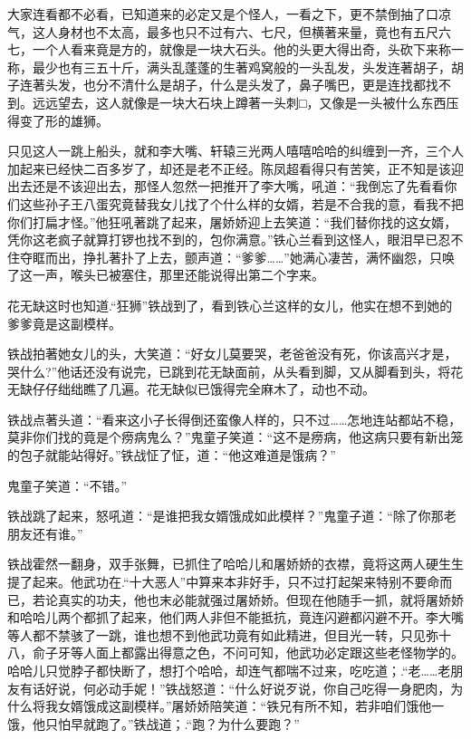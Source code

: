 \documentclass[12pt,oneside]{book}
\begin{document}
大家连看都不必看，已知道来的必定又是个怪人，一看之下，更不禁倒抽了口凉气，这人身材也不太高，最多也只不过有六、七尺，但横著来量，竟也有五尺六七，一个人看来竟是方的，就像是一块大石头。他的头更大得出奇，头砍下来称一称，最少也有三五十斤，满头乱蓬蓬的生著鸡窝般的一头乱发，头发连著胡子，胡子连著头发，也分不清什么是胡子，什么是头发了，鼻子嘴巴，更是连找都找不到。远远望去，这人就像是一块大石块上蹲著一头刺□，又像是一头被什么东西压得变了形的雄狮。

只见这人一跳上船头，就和李大嘴、轩辕三光两人嘻嘻哈哈的纠缠到一齐，三个人加起来已经快二百多岁了，却还是老不正经。陈凤超看得只有苦笑，正不知是该迎出去还是不该迎出去，那怪人忽然一把推开了李大嘴，吼道：``我倒忘了先看看你们这些孙子王八蛋究竟替我女儿找了个什么样的女婿，若是不合我的意，看我不把你们打扁才怪。''他狂吼著跳了起来，屠娇娇迎上去笑道：``我们替你找的这女婿，凭你这老疯子就算打锣也找不到的，包你满意。''铁心兰看到这怪人，眼泪早已忍不住夺眶而出，挣扎著扑了上去，颤声道：``爹爹\ldots\ldots{}''她满心凄苦，满怀幽怨，只唤了这一声，喉头已被塞住，那里还能说得出第二个字来。

花无缺这时也知道.``狂狮''铁战到了，看到铁心兰这样的女儿，他实在想不到她的爹爹竟是这副模样。

铁战拍著她女儿的头，大笑道：``好女儿莫要哭，老爸爸没有死，你该高兴才是，哭什么?''他话还没有说完，已跳到花无缺面前，从头看到脚，又从脚看到头，将花无缺仔仔绌绌瞧了几遍。花无缺似已饿得完全麻木了，动也不动。

铁战点著头道：``看来这小子长得倒还蛮像人样的，只不过\ldots\ldots 怎地连站都站不稳，莫非你们找的竟是个痨病鬼么？''鬼童子笑道：``这不是痨病，他这病只要有新出笼的包子就能站得好。''铁战怔了怔，道：``他这难道是饿病？''

鬼童子笑道：``不错。''

铁战跳了起来，怒吼道：``是谁把我女婿饿成如此模样？''鬼童子道：``除了你那老朋友还有谁。''

铁战霍然一翻身，双手张舞，已抓住了哈哈儿和屠娇娇的衣襟，竟将这两人硬生生提了起来。他武功在.``十大恶人''中算来本非好手，只不过打起架来特别不要命而已，若论真实的功夫，他也末必能就强过屠娇娇。但现在他随手一抓，就将屠娇娇和哈哈儿两个都抓了起来，他们两人非但不能抵抗，竟连闪避都闪避不开。李大嘴等人都不禁骇了一跳，谁也想不到他武功竟有如此精进，但目光一转，只见弥十八，俞子牙等人面上都露出得意之色，不问可知，他武功必定跟这些老怪物学的。哈哈儿只觉脖子都快断了，想打个哈哈，却连气都喘不过来，吃吃道；.``老\ldots\ldots 老朋友有话好说，何必动手妮！''铁战怒道：``什么好说歹说，你自己吃得一身肥肉，为什么将我女婿饿成这副模样。''屠娇娇陪笑道：``铁兄有所不知，若非咱们饿他一饿，他只怕早就跑了。''铁战道；.``跑？为什么要跑？''
\end{document}
